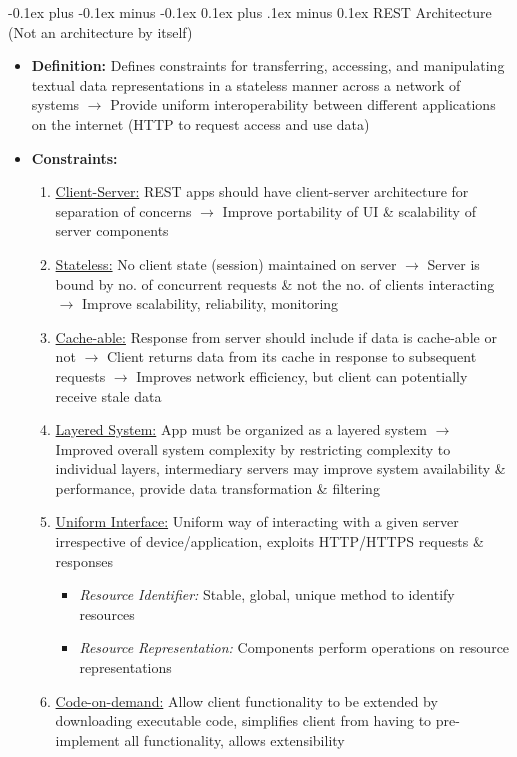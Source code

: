\documentclass[landscape]{article}
\makeatletter
\renewcommand{\subsection}{\@startsection{subsection}{2}{0mm}%
  {-0.1ex plus -0.1ex minus -0.1ex}%
  {0.1ex plus .1ex minus 0.1ex}%
{\normalfont\scriptsize\bfseries}}
\makeatother
\begin{document}
\begin{multicols*}{5}
    \subsection{REST Architecture} (Not an architecture by itself)
    \begin{itemize}
      \item \textbf{Definition:} Defines constraints for transferring, accessing, and manipulating textual data representations in a stateless manner across a network of systems $\rightarrow$ Provide uniform interoperability between different applications on the internet (HTTP to request access and use data)
      \item \textbf{Constraints:}
      \begin{enumerate}
        \item \underline{Client-Server:} REST apps should have client-server architecture for separation of concerns $\rightarrow$ Improve portability of UI \& scalability of server components
        \item \underline{Stateless:} No client state (session) maintained on server $\rightarrow$ Server is bound by no. of concurrent requests \& not the no. of clients interacting $\rightarrow$ Improve scalability, reliability, monitoring
        \item \underline{Cache-able:} Response from server should include if data is cache-able or not $\rightarrow$ Client returns data from its cache in response to subsequent requests $\rightarrow$ Improves network efficiency, but client can potentially receive stale data
        \item \underline{Layered System:} App must be organized as a layered system $\rightarrow$ Improved overall system complexity by restricting complexity to individual layers, intermediary servers may improve system availability \& performance, provide data transformation \& filtering 
        \item \underline{Uniform Interface:} Uniform way of interacting with a given server irrespective of device/application, exploits HTTP/HTTPS requests \& responses
        \begin{itemize}
          \item \textit{Resource Identifier:} Stable, global, unique method to identify resources
          \item \textit{Resource Representation:} Components perform operations on resource representations
        \end{itemize}
        \item \underline{Code-on-demand:} Allow client functionality to be extended by downloading executable code, simplifies client from having to pre-implement all functionality, allows extensibility

\end{enumerate}
\end{itemize}
\end{multicols*}
\end{document}
